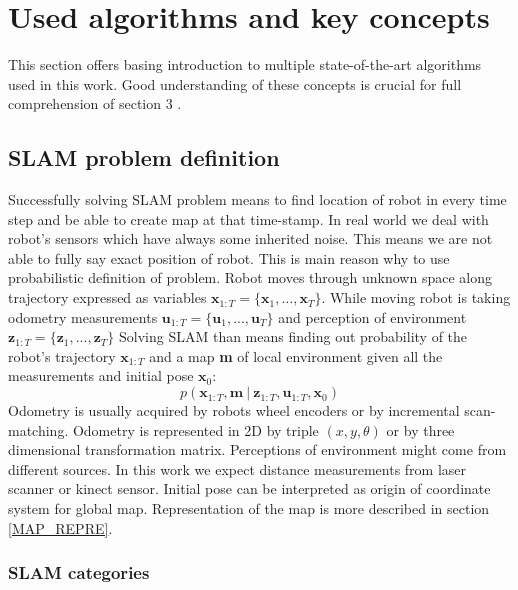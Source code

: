 \chapter{Used algorithms and key concepts}
This section offers basing introduction to multiple state-of-the-art algorithms used in this work. Good understanding of these concepts is crucial for full comprehension of section 3 . 

\section{SLAM problem definition}
Successfully solving SLAM problem means to find location of robot in every time step and be able to create map at that time-stamp. In real world we deal with robot's sensors which have always some inherited noise. This means we are not able to fully say exact position of robot. This is main reason why to use probabilistic definition of problem. Robot moves through unknown space along trajectory expressed as variables $ \textbf{x}_{1:T} = \{\textbf{x}_{1},...,\textbf{x}_{T}\} $. While moving robot is taking odometry measurements $ \textbf{u}_{1:T} = \{\textbf{u}_{1},...,\textbf{u}_{T}\}$ and perception of environment $ \textbf{z}_{1:T} = \{\textbf{z}_{1},...,\textbf{z}_{T}\}$ Solving SLAM than means finding out probability of the robot's trajectory $ \textbf{x}_{1:T}$ and a map \textbf{m} of local environment given all the measurements and initial pose $ \textbf{x}_{0}$:
\begin{equation}
p(\textbf{x}_{1:T}, \textbf{m}\: |\:  \textbf{z}_{1:T}, \textbf{u}_{1:T}, \textbf{x}_{0})
\end{equation}
Odometry is usually acquired by robots wheel encoders or by incremental scan-matching. Odometry is represented in 2D by triple $(x,y,\theta)$ or by three dimensional transformation matrix. Perceptions of environment might come from different sources. In this work we expect distance measurements from laser scanner or kinect sensor. Initial pose can be interpreted as origin of coordinate system for global map. Representation of the map is more described in section \ref{MAP_REPRE}.

\subsection{SLAM categories}
\newpage
